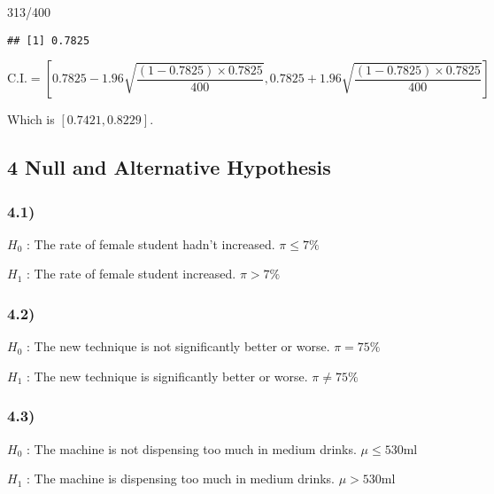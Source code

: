 \documentclass[
]{article}
\newenvironment{Shaded}{\begin{snugshade}}{\end{snugshade}}
\newcommand{\DecValTok}[1]{\textcolor[rgb]{0.00,0.00,0.81}{#1}}
\newcommand{\SpecialCharTok}[1]{\textcolor[rgb]{0.00,0.00,0.00}{#1}}
\begin{document}
\begin{Shaded}
\begin{Highlighting}[]
\DecValTok{313}\SpecialCharTok{/}\DecValTok{400}
\end{Highlighting}
\end{Shaded}

\begin{verbatim}
## [1] 0.7825
\end{verbatim}

\[
\text{C.I.} = [0.7825 - 1.96 \sqrt{\frac{(1-0.7825) \times 0.7825}{400}},0.7825 + 1.96 \sqrt{\frac{(1-0.7825) \times 0.7825}{400}}]
\]

Which is \([0.7421, 0.8229]\).

\hypertarget{null-and-alternative-hypothesis}{%
\subsection{4 Null and Alternative
Hypothesis}\label{null-and-alternative-hypothesis}}

\hypertarget{section-1}{%
\subsubsection{4.1)}\label{section-1}}

\(H_0\) : The rate of female student hadn't increased. \(\pi \leq 7 \%\)

\(H_1\) : The rate of female student increased. \(\pi > 7 \%\)

\hypertarget{section-2}{%
\subsubsection{4.2)}\label{section-2}}

\(H_0\) : The new technique is not significantly better or worse.
\(\pi = 75 \%\)

\(H_1\) : The new technique is significantly better or worse.
\(\pi \not = 75 \%\)

\hypertarget{section-3}{%
\subsubsection{4.3)}\label{section-3}}

\(H_0\) : The machine is not dispensing too much in medium drinks.
\(\mu \leq 530 \text{ml}\)

\(H_1\) : The machine is dispensing too much in medium drinks.
\(\mu > 530 \text{ml}\)
\end{document}
